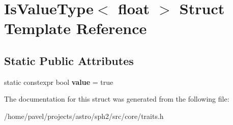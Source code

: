 \hypertarget{structIsValueType_3_01float_01_4}{}\section{Is\+Value\+Type$<$ float $>$ Struct Template Reference}
\label{structIsValueType_3_01float_01_4}
\subsection*{Static Public Attributes}
\begin{DoxyCompactItemize}
\item 
\hypertarget{structIsValueType_3_01float_01_4_a8813074466c5bfacc128beef976fa45a}{}\label{structIsValueType_3_01float_01_4_a8813074466c5bfacc128beef976fa45a} 
static constexpr bool {\bfseries value} = true
\end{DoxyCompactItemize}


The documentation for this struct was generated from the following file\+:\begin{DoxyCompactItemize}
\item 
/home/pavel/projects/astro/sph2/src/core/traits.\+h\end{DoxyCompactItemize}
